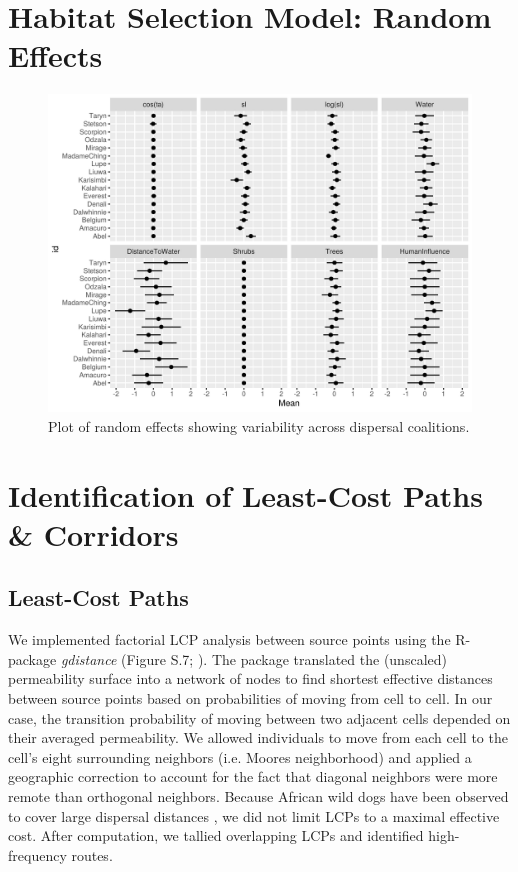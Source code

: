 \documentclass[abstract=off,10pt,a4paper,bibliography=totocnumbered]{article}
\begin{document}
\newpage
\section{Habitat Selection Model: Random Effects}
\begin{figure}[hbtp]
  \includegraphics[width = \textwidth]{99_RandomEffects}
  \caption{Plot of random effects showing variability across dispersal
  coalitions.}
  \label{RandomEffects}
\end{figure}

\newpage
\section{Identification of Least-Cost Paths \& Corridors}
\subsection{Least-Cost Paths}
We implemented factorial LCP analysis between source points using the R-package
\textit{gdistance} (Figure S.7; \citealp{vanEtten.2017}). The package translated
the (unscaled) permeability surface into a network of nodes to find shortest
effective distances between source points based on probabilities of moving from
cell to cell. In our case, the transition probability of moving between two
adjacent cells depended on their averaged permeability. We allowed individuals
to move from each cell to the cell's eight surrounding neighbors (i.e. Moores
neighborhood) and applied a geographic correction to account for the fact that
diagonal neighbors were more remote than orthogonal neighbors. Because African
wild dogs have been observed to cover large dispersal distances
\citep{DaviesMostert.2012, Masenga.2016, Cozzi.2020}, we did not limit LCPs to a
maximal effective cost. After computation, we tallied overlapping LCPs and
identified high-frequency routes.
\end{document}
